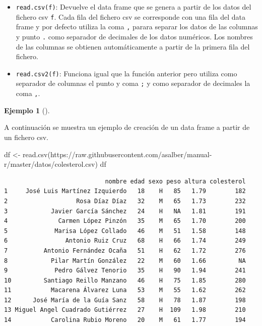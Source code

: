 \documentclass[
  a4paper,
]{scrreport}
\newenvironment{Shaded}{\begin{snugshade}}{\end{snugshade}}
\newcommand{\FunctionTok}[1]{\textcolor[rgb]{0.28,0.35,0.67}{#1}}
\newcommand{\NormalTok}[1]{\textcolor[rgb]{0.00,0.23,0.31}{#1}}
\newcommand{\OtherTok}[1]{\textcolor[rgb]{0.00,0.23,0.31}{#1}}
\newcommand{\StringTok}[1]{\textcolor[rgb]{0.13,0.47,0.30}{#1}}
\providecommand{\tightlist}{%
  \setlength{\itemsep}{0pt}\setlength{\parskip}{0pt}}\usepackage{longtable,booktabs,array}
\theoremstyle{definition}
\theoremstyle{definition}
\newtheorem{example}{Ejemplo}[chapter]
\theoremstyle{remark}
\begin{document}
\begin{itemize}
\tightlist
\item
  \texttt{read.csv(f)}: Devuelve el data frame que se genera a partir de
  los datos del fichero csv \texttt{f}. Cada fila del fichero csv se
  corresponde con una fila del data frame y por defecto utiliza la coma
  \texttt{,} parara separar los datos de las columnas y punto \texttt{.}
  como separador de decimales de los datos numéricos. Los nombres de las
  columnas se obtienen automáticamente a partir de la primera fila del
  fichero.
\item
  \texttt{read.csv2(f)}: Funciona igual que la función anterior pero
  utiliza como separador de columnas el punto y coma \texttt{;} y como
  separador de decimales la coma \texttt{,}.
\end{itemize}

\leavevmode{}%
\begin{example}[]\label{exm-creacion-data-frame-csv}

A continuación se muestra un ejemplo de creación de un data frame a
partir de un fichero csv.

\begin{Shaded}
\begin{Highlighting}[]
\NormalTok{df }\OtherTok{\textless{}{-}} \FunctionTok{read.csv}\NormalTok{(}\StringTok{\textquotesingle{}https://raw.githubusercontent.com/asalber/manual{-}r/master/datos/colesterol.csv\textquotesingle{}}\NormalTok{)}
\NormalTok{df}
\end{Highlighting}
\end{Shaded}

\begin{verbatim}
                            nombre edad sexo peso altura colesterol
1     José Luis Martínez Izquierdo   18    H   85   1.79        182
2                   Rosa Díaz Díaz   32    M   65   1.73        232
3            Javier García Sánchez   24    H   NA   1.81        191
4              Carmen López Pinzón   35    M   65   1.70        200
5             Marisa López Collado   46    M   51   1.58        148
6                Antonio Ruiz Cruz   68    H   66   1.74        249
7          Antonio Fernández Ocaña   51    H   62   1.72        276
8            Pilar Martín González   22    M   60   1.66         NA
9             Pedro Gálvez Tenorio   35    H   90   1.94        241
10         Santiago Reillo Manzano   46    H   75   1.85        280
11           Macarena Álvarez Luna   53    M   55   1.62        262
12      José María de la Guía Sanz   58    H   78   1.87        198
13 Miguel Angel Cuadrado Gutiérrez   27    H  109   1.98        210
14           Carolina Rubio Moreno   20    M   61   1.77        194
\end{verbatim}

\end{example}
\end{document}
